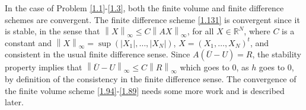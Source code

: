 \documentclass[a4paper]{article}
\numberwithin{equation}{section}
\begin{document}
In the case of Problem \eqref{1.1}-\eqref{1.3}, both the finite volume and finite difference schemes are convergent. The finite difference scheme \eqref{1.131} is convergent since it is stable, in the sense that ${\left\| X \right\|_\infty } \le C{\left\| {AX} \right\|_\infty }$, for all $X\in \mathbb{R}^N$, where $C$ is a constant and ${\left\| X \right\|_\infty } = \sup \left( {\left| {{X_1}} \right|, \ldots ,\left| {{X_N}} \right|} \right)$, $X = {\left( {{X_1}, \ldots ,{X_N}} \right)^t}$, and consistent in the usual finite difference sense. Since $A\left( {\overline U  - U} \right) = R$, the stability property implies that ${\left\| {\overline U  - U} \right\|_\infty } \le C{\left\| R \right\|_\infty }$ which goes to 0, as $h$ goes to 0, by definition of the consistency in the finite difference sense. The convergence of the finite volume scheme \eqref{1.94}-\eqref{1.89} needs some more work and is described later.
\end{document}
